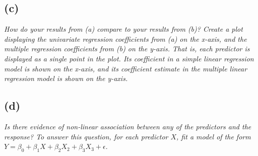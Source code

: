 \documentclass[a4paper,man,natbib]{apa6}
\begin{document}
\subsection{(c)}
\emph{
	How do your results from (a) compare to your results from (b)?
	Create a plot displaying the univariate regression coefficients
	from (a) on the x-axis, and the multiple regression coefficients
	from (b) on the y-axis. That is, each predictor is displayed as a
	single point in the plot. Its coefficient in a simple linear regression model is shown on the x-axis, and its coefficient estimate
	in the multiple linear regression model is shown on the y-axis.
}

\subsection{(d)}
\emph{
	Is there evidence of non-linear association between any of the
	predictors and the response? To answer this question, for each
	predictor $X$, fit a model of the form} \\
	$Y = \beta_0 + \beta_1X + \beta_2X_2 + \beta_3X_3 + \epsilon$.
	
\end{document}
